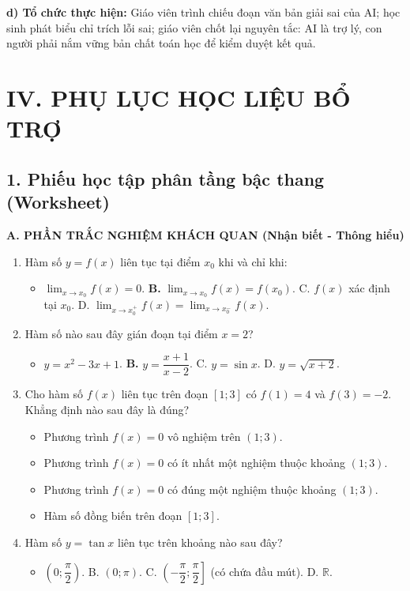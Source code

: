 \documentclass[12pt, a4paper]{article}
\begin{document}
\noindent \textbf{d) Tổ chức thực hiện:}
Giáo viên trình chiếu đoạn văn bản giải sai của AI; học sinh phát biểu chỉ trích lỗi sai; giáo viên chốt lại nguyên tắc: AI là trợ lý, con người phải nắm vững bản chất toán học để kiểm duyệt kết quả.

\section*{IV. PHỤ LỤC HỌC LIỆU BỔ TRỢ}

\subsection*{1. Phiếu học tập phân tầng bậc thang (Worksheet)}

\noindent \textbf{A. PHẦN TRẮC NGHIỆM KHÁCH QUAN (Nhận biết - Thông hiểu)}
\begin{enumerate}[leftmargin=0.6cm]
    \item Hàm số $y = f(x)$ liên tục tại điểm $x_0$ khi và chỉ khi:
    \begin{itemize}[leftmargin=0.6cm]
        \item[A.] $\lim_{x \to x_0} f(x) = 0$. \quad \textbf{B.} $\lim_{x \to x_0} f(x) = f(x_0)$. \quad C. $f(x)$ xác định tại $x_0$. \quad D. $\lim_{x \to x_0^+} f(x) = \lim_{x \to x_0^-} f(x)$.
    \end{itemize}
    \item Hàm số nào sau đây gián đoạn tại điểm $x = 2$?
    \begin{itemize}[leftmargin=0.6cm]
        \item[A.] $y = x^2 - 3x + 1$. \quad \textbf{B.} $y = \dfrac{x + 1}{x - 2}$. \quad C. $y = \sin x$. \quad D. $y = \sqrt{x + 2}$.
    \end{itemize}
    \item Cho hàm số $f(x)$ liên tục trên đoạn $[1; 3]$ có $f(1) = 4$ và $f(3) = -2$. Khẳng định nào sau đây là đúng?
    \begin{itemize}[leftmargin=0.6cm]
        \item[A.] Phương trình $f(x) = 0$ vô nghiệm trên $(1; 3)$.
        \item[\textbf{B.}] Phương trình $f(x) = 0$ có ít nhất một nghiệm thuộc khoảng $(1; 3)$.
        \item[C.] Phương trình $f(x) = 0$ có đúng một nghiệm thuộc khoảng $(1; 3)$.
        \item[D.] Hàm số đồng biến trên đoạn $[1; 3]$.
    \end{itemize}
    \item Hàm số $y = \tan x$ liên tục trên khoảng nào sau đây?
    \begin{itemize}[leftmargin=0.6cm]
        \item[\textbf{A.}] $\left(0; \dfrac{\pi}{2}\right)$. \quad B. $(0; \pi)$. \quad C. $\left(-\dfrac{\pi}{2}; \dfrac{\pi}{2}\right]$ (có chứa đầu mút). \quad D. $\mathbb{R}$.
    \end{itemize}
\end{enumerate}
\end{document}
